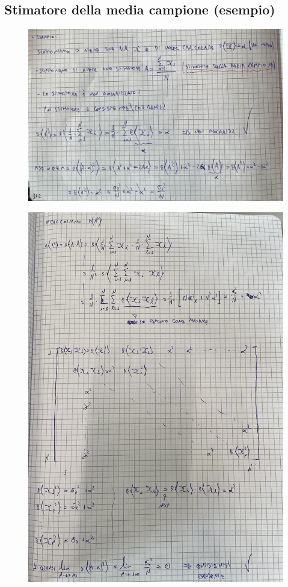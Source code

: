 \documentclass{article}
\begin{document}
\subsection{Stimatore della media campione (esempio)}
\begin{figure}[ht]
\centering
\includegraphics[scale=0.16]{ese/53.jpeg}
\end{figure}
\begin{figure}[ht]
\centering
\includegraphics[scale=0.16]{ese/53a.jpeg}
\end{figure}
\end{document}
